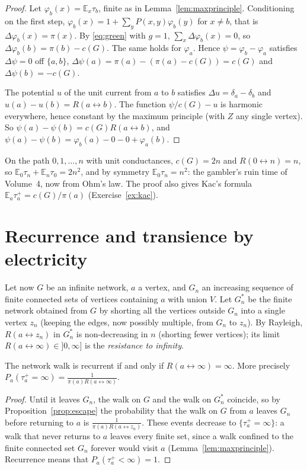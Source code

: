 \begin{proof}
Let $\varphi_b(x)=\mathbb E_x\tau_b$, finite as in Lemma~\ref{lem:maxprinciple}. Conditioning on the first step, $\varphi_b(x)=1+\sum_yP(x,y)\varphi_b(y)$ for $x\ne b$, that is $\Delta\varphi_b(x)=\pi(x)$. By \eqref{eq:green} with
$g=1$, $\sum_x\Delta\varphi_b(x)=0$, so $\Delta\varphi_b(b)=\pi(b)-c(G)$. The same holds for $\varphi_a$. Hence $\psi=\varphi_b-\varphi_a$ satisfies $\Delta\psi=0$ off $\{a,b\}$, $\Delta\psi(a)=\pi(a)-(\pi(a)-c(G))=c(G)$ and
$\Delta\psi(b)=-c(G)$.

The potential $u$ of the unit current from $a$ to $b$ satisfies $\Delta u=\delta_a-\delta_b$ and $u(a)-u(b)=R(a\leftrightarrow b)$. The function $\psi/c(G)-u$ is harmonic everywhere, hence constant by the maximum principle (with
$Z$ any single vertex). So $\psi(a)-\psi(b)=c(G)R(a\leftrightarrow b)$, and $\psi(a)-\psi(b)=\varphi_b(a)-0-0+\varphi_a(b)$.
\end{proof}

On the path $0,1,\dots,n$ with unit conductances, $c(G)=2n$ and $R(0\leftrightarrow n)=n$, so $\mathbb E_0\tau_n+\mathbb E_n\tau_0=2n^2$, and by symmetry $\mathbb E_0\tau_n=n^2$: the gambler's ruin time of Volume~4, now from Ohm's law. The proof also
gives Kac's formula $\mathbb E_a\tau_a^+=c(G)/\pi(a)$ (Exercise~\ref{ex:kac}).

\section{Recurrence and transience by electricity}

Let now $G$ be an infinite network, $a$ a vertex, and $G_n$ an increasing sequence of finite connected sets of vertices containing $a$ with union $V$. Let $G_n^*$ be the finite network obtained from $G$ by shorting all the
vertices outside $G_n$ into a single vertex $z_n$ (keeping the edges, now possibly multiple, from $G_n$ to $z_n$). By Rayleigh, $R(a\leftrightarrow z_n)$ in $G_n^*$ is non-decreasing in $n$ (shorting fewer vertices); its limit
$R(a\leftrightarrow\infty)\in]0,\infty]$ is the \emph{resistance to infinity}.

\begin{theorem}\label{thm:recurrentR}
The network walk is recurrent if and only if $R(a\leftrightarrow\infty)=\infty$. More precisely $P_a(\tau_a^+=\infty)=\frac1{\pi(a)R(a\leftrightarrow\infty)}$.
\end{theorem}

\begin{proof}
Until it leaves $G_n$, the walk on $G$ and the walk on $G_n^*$ coincide, so by Proposition~\ref{prop:escape} the probability that the walk on $G$ from $a$ leaves $G_n$ before returning to $a$ is $\frac1{\pi(a)R(a\leftrightarrow z_n)}$. These events
decrease to $\{\tau_a^+=\infty\}$: a walk that never returns to $a$ leaves every finite set, since a walk confined to the finite connected set $G_n$ forever would visit $a$ (Lemma~\ref{lem:maxprinciple}). Recurrence means that
$P_a(\tau_a^+<\infty)=1$.
\end{proof}

